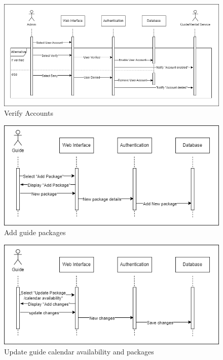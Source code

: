 \begin{figure}[h!]
    \centering
    \includegraphics[width=1\textwidth]{Images/Sequence Diagrams/Sequence diagrams-3-Verify Accounts.drawio.png}
    \caption{Verify Accounts}
\end{figure}


\begin{figure}[h!]
    \centering
    \includegraphics[width=1\textwidth]{Images/Sequence Diagrams/Sequence diagrams-6-Add guide package.drawio.png}
    \caption{Add guide packages}
\end{figure}

\begin{figure}[h!]
    \centering
    \includegraphics[width=1\textwidth]{Images/Sequence Diagrams/Sequence diagrams-7-Update guide calendar availability_pacakges.drawio.png}
    \caption{Update guide calendar availability and packages}
\end{figure}

